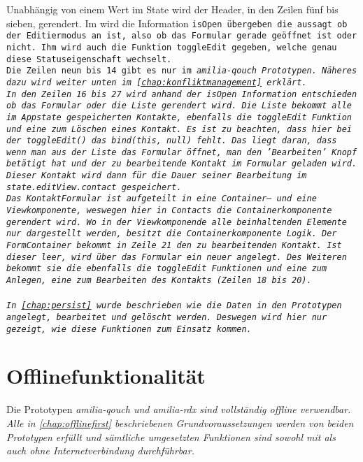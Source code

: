 %
\begin{center}
  
\end{center}
%
Unabhängig von einem Wert im State wird der Header, in den Zeilen fünf bis sieben, gerendert.
Im wird die Information \tt{isOpen} übergeben die aussagt ob der Editiermodus an ist, also ob das Formular gerade geöffnet ist oder nicht.
Ihm wird auch die Funktion \tt{toggleEdit} gegeben, welche genau diese Statuseigenschaft wechselt.\\
Die Zeilen neun bis 14 gibt es nur im \it{amilia-qouch} Prototypen. Näheres dazu wird weiter unten im \autoref{chap:konfliktmanagement} erklärt.\\
In den Zeilen 16 bis 27 wird anhand der \tt{isOpen} Information entschieden ob das Formular oder die Liste gerendert wird.
Die Liste bekommt alle im \gls{App}state gespeicherten Kontakte, ebenfalls die \tt{toggleEdit} Funktion und eine zum Löschen eines Kontakt. Es ist zu beachten, dass hier bei der \tt{toggleEdit()} das \tt{bind(this, null)} fehlt. Das liegt daran, dass wenn man aus der Liste das Formular öffnet, man den 'Bearbeiten' Knopf betätigt hat und der zu bearbeitende Kontakt im Formular geladen wird. Dieser Kontakt wird dann für die Dauer seiner Bearbeitung im \tt{state.editView.contact} gespeichert.\\
Das KontaktFormular ist aufgeteilt in eine Container-- und eine Viewkomponente, weswegen hier in \tt{Contacts} die Containerkomponente gerendert wird.
Wo in der Viewkomponende alle beinhaltenden Elemente nur dargestellt werden, besitzt die Containerkomponente Logik.
Der \tt{FormContainer} bekommt in Zeile 21 den zu bearbeitenden Kontakt. Ist dieser leer, wird über das Formular ein neuer angelegt.
Des Weiteren bekommt sie die ebenfalls die \tt{toggleEdit} Funktionen und eine zum Anlegen, eine zum Bearbeiten des Kontakts (Zeilen 18 bis 20).\\\\
In \autoref{chap:persist} wurde beschrieben wie die Daten in den Prototypen angelegt, bearbeitet und gelöscht werden. Deswegen wird hier nur gezeigt, wie diese Funktionen zum Einsatz kommen.


%
%
%
\section{Offlinefunktionalität}
Die Prototypen \it{amilia-qouch} und \it{amilia-rdx} sind vollständig offline verwendbar.
Alle in \autoref{chap:offlinefirst} beschriebenen Grundvoraussetzungen werden von beiden Prototypen erfüllt und sämtliche umgesetzten Funktionen sind sowohl mit als auch ohne Internetverbindung durchführbar.
%

%
%
%
